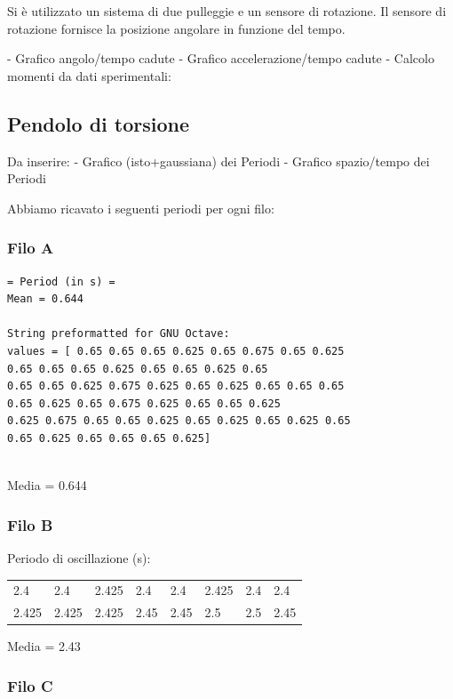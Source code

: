 \documentclass[a4paper,10pt]{report}
\begin{document}
Si è utilizzato un sistema di due pulleggie e un sensore di rotazione.
Il sensore di rotazione fornisce la posizione angolare in funzione del tempo. 



- Grafico angolo/tempo cadute
- Grafico accelerazione/tempo cadute
- Calcolo momenti da dati sperimentali:





\subsection{Pendolo di torsione}

Da inserire:
- Grafico (isto+gaussiana) dei Periodi
- Grafico spazio/tempo dei Periodi


Abbiamo ricavato i seguenti periodi per ogni filo:
\subsubsection{Filo A}

\begin{verbatim}
= Period (in s) =
Mean = 0.644

String preformatted for GNU Octave:
values = [ 0.65 0.65 0.65 0.625 0.65 0.675 0.65 0.625
0.65 0.65 0.65 0.625 0.65 0.65 0.625 0.65
0.65 0.65 0.625 0.675 0.625 0.65 0.625 0.65 0.65 0.65
0.65 0.625 0.65 0.675 0.625 0.65 0.65 0.625
0.625 0.675 0.65 0.65 0.625 0.65 0.625 0.65 0.625 0.65
0.65 0.625 0.65 0.65 0.65 0.625]


\end{verbatim}


Media = 0.644

\subsubsection{Filo B}
Periodo di oscillazione (s):
\\
\begin{center}
\begin{tabular}{llllllll}
2.4   & 2.4   & 2.425 & 2.4  & 2.4   & 2.425 & 2.4  & 2.4 \\
2.425 & 2.425 & 2.425 & 2.45 & 2.45  & 2.5   & 2.5  & 2.45 \\
\end{tabular}
\end{center}
Media = 2.43

\subsubsection{Filo C}
\end{document}
